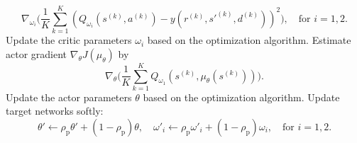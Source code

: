 \documentclass[11pt]{article}
\begin{document}
\begin{algorithm}[htbp]
\begin{algorithmic}[1]
\begin{equation*}
\nabla_{\omega_i} \Biggl(\frac{1}{K} \sum\limits_{k=1}^K \left(Q_{\omega_i}(s^{(k)}, a^{(k)}) - y(r^{(k)}, {s'}^{(k)}, d^{(k)}) \right)^2 \Biggr), \quad \text{for} \,\, i=1,2.
\end{equation*}
\State Update the critic parameters $\omega_i$ based on the optimization algorithm.
\State Estimate actor gradient $\nabla_\theta J(\mu_\theta)$ by
\begin{equation*}
\nabla_{\theta} \Biggl(\frac{1}{K} \sum\limits_{k=1}^K Q_{\omega_1}(s^{(k)}, \mu_\theta(s^{(k)})) \Biggr).
\end{equation*}
\State Update the actor parameters $\theta$ based on the optimization algorithm.
\State Update target networks softly:
\begin{equation*}
\theta' \leftarrow \rho_\text{p} \theta' + (1 - \rho_\text{p})\theta, \quad
{\omega'}_i \leftarrow \rho_\text{p} {\omega'}_i + (1 - \rho_\text{p})\omega_i, \quad \text{for} \, \, i=1, 2.
\end{equation*}
\EndIf
\EndFor
{}
\end{algorithmic}
\end{algorithm}
\end{document}
